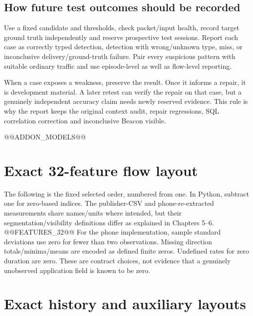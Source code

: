 \documentclass[11pt,a4paper,oneside]{report}
\begin{document}
\section{How future test outcomes should be recorded}
Use a fixed candidate and thresholds, check packet/input health, record target ground truth independently and reserve prospective test sessions. Report each case as correctly typed detection, detection with wrong/unknown type, miss, or inconclusive delivery/ground-truth failure. Pair every suspicious pattern with suitable ordinary traffic and use episode-level as well as flow-level reporting.

When a case exposes a weakness, preserve the result. Once it informs a repair, it is development material. A later retest can verify the repair on that case, but a genuinely independent accuracy claim needs newly reserved evidence. This rule is why the report keeps the original context audit, repair regressions, SQL correlation correction and inconclusive Beacon visible.

@@ADDON_MODELS@@

\appendix
\chapter{Exact 32-feature flow layout}
The following is the fixed selected order, numbered from one. In Python, subtract one for zero-based indices. The publisher-CSV and phone-re-extracted measurements share names/units where intended, but their segmentation/visibility definitions differ as explained in Chapters 5--6.
@@FEATURES_32@@
For the phone implementation, sample standard deviations use zero for fewer than two observations. Missing direction totals/minima/means are encoded as defined finite zeros. Undefined rates for zero duration are zero. These are contract choices, not evidence that a genuinely unobserved application field is known to be zero.

\chapter{Exact history and auxiliary layouts}
\end{document}
